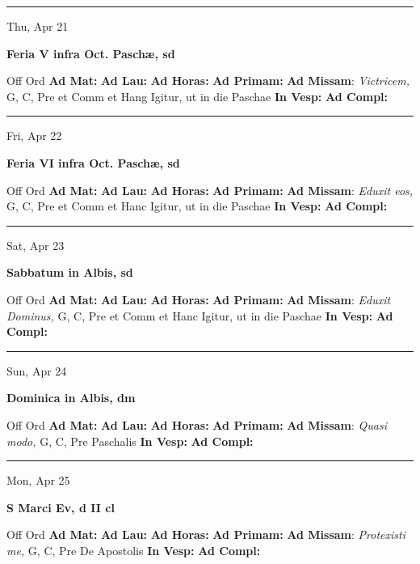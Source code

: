 \documentclass[letterpaper, 10pt]{article}
\begin{document}
\hrule
\begin{center}
Thu, Apr 21
\end{center}\textbf{ \large Feria V infra Oct. Paschæ, \textnormal{\normalsize sd}}
\begin{justify}
Off Ord
\textbf{Ad Mat: }
\textbf{Ad Lau: }
\textbf{Ad Horas: }
\textbf{Ad Primam: }
\textbf{Ad Missam}: \textit{Victricem,} G, C, Pre et Comm et Hang Igitur, ut in die Paschae
\textbf{In Vesp: }
\textbf{Ad Compl: }\end{justify}



\hrule
\begin{center}
Fri, Apr 22
\end{center}\textbf{ \large Feria VI infra Oct. Paschæ, \textnormal{\normalsize sd}}
\begin{justify}
Off Ord
\textbf{Ad Mat: }
\textbf{Ad Lau: }
\textbf{Ad Horas: }
\textbf{Ad Primam: }
\textbf{Ad Missam}: \textit{Eduxit eos,} G, C, Pre et Comm et Hanc Igitur, ut in die Paschae
\textbf{In Vesp: }
\textbf{Ad Compl: }\end{justify}



\hrule
\begin{center}
Sat, Apr 23
\end{center}\textbf{ \large Sabbatum in Albis, \textnormal{\normalsize sd}}
\begin{justify}
Off Ord
\textbf{Ad Mat: }
\textbf{Ad Lau: }
\textbf{Ad Horas: }
\textbf{Ad Primam: }
\textbf{Ad Missam}: \textit{Eduxit Dominus,} G, C, Pre et Comm et Hanc Igitur, ut in die Paschae
\textbf{In Vesp: }
\textbf{Ad Compl: }\end{justify}



\hrule
\begin{center}
Sun, Apr 24
\end{center}\textbf{ \large Dominica in Albis, \textnormal{\normalsize dm}}
\begin{justify}
Off Ord
\textbf{Ad Mat: }
\textbf{Ad Lau: }
\textbf{Ad Horas: }
\textbf{Ad Primam: }
\textbf{Ad Missam}: \textit{Quasi modo,} G, C, Pre Paschalis
\textbf{In Vesp: }
\textbf{Ad Compl: }\end{justify}



\hrule
\begin{center}
Mon, Apr 25
\end{center}\textbf{ \large S Marci Ev, \textnormal{\normalsize d II cl}}
\begin{justify}
Off Ord
\textbf{Ad Mat: }
\textbf{Ad Lau: }
\textbf{Ad Horas: }
\textbf{Ad Primam: }
\textbf{Ad Missam}: \textit{Protexisti me,} G, C, Pre De Apostolis
\textbf{In Vesp: }
\textbf{Ad Compl: }\end{justify}
\end{document}

